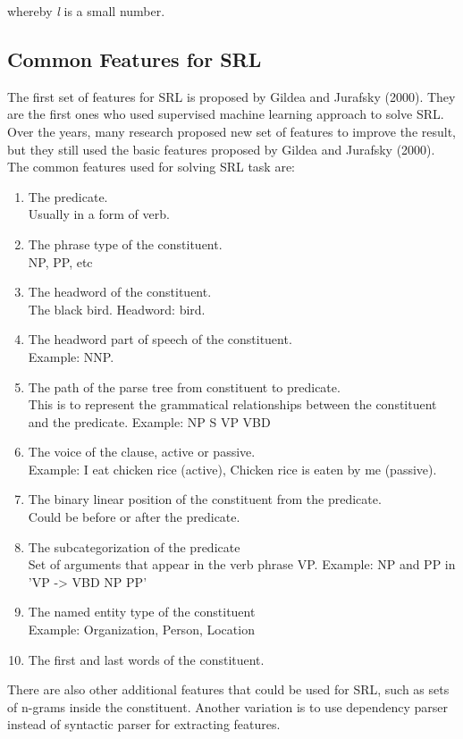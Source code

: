 whereby \textit{l} is a small number. 

\subsection{Common Features for SRL}
The first set of features for SRL is proposed by Gildea and Jurafsky (2000). They are the first ones who used supervised machine learning approach to solve SRL. Over the years, many research proposed new set of features to improve the result, but they still used the basic features proposed by Gildea and Jurafsky (2000). The common features used for solving SRL task are:
\begin{enumerate}
	\item The predicate.\\
	Usually in a form of verb.
	\item The phrase type of the constituent.\\
	NP, PP, etc
	\item The headword of the constituent.\\
	The black bird. Headword: bird.
	\item The headword part of speech of the constituent. \\
	Example: NNP.
	\item The path of the parse tree from constituent to predicate. \\
	This is to represent the grammatical relationships between the constituent and the predicate.
	Example: NP S VP VBD
	\item The voice of the clause, active or passive.\\
	Example: I eat chicken rice (active), Chicken rice is eaten by me (passive).
	\item The binary linear position of the constituent from the predicate.\\
	Could be before or after the predicate.
	\item The subcategorization of the predicate\\
	Set of arguments that appear in the verb phrase VP.
	Example: NP and PP in 'VP -> VBD NP PP'
	\item The named entity type of the constituent\\
	Example: Organization, Person, Location
	\item The first and last words of the constituent.
\end{enumerate}

There are also other additional features that could be used for SRL, such as sets of n-grams inside the constituent. Another variation is to use dependency parser instead of syntactic parser for extracting features.

